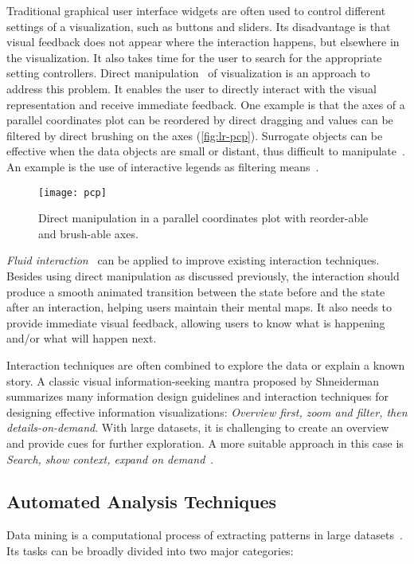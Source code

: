 Traditional graphical user interface widgets are often used to control different settings of a visualization, such as buttons and sliders. Its disadvantage is that visual feedback does not appear where the interaction happens, but elsewhere in the visualization. It also takes time for the user to search for the appropriate setting controllers. Direct manipulation~\cite{Shneiderman1982} of visualization is an approach to address this problem. It enables the user to directly interact with the visual representation and receive immediate feedback. One example is that the axes of a parallel coordinates plot can be reordered by direct dragging and values can be filtered by direct brushing on the axes (\autoref{fig:lr-pcp}). Surrogate objects can be effective when the data objects are small or distant, thus difficult to manipulate~\cite{Kwon2011}. An example is the use of interactive legends as filtering means~\cite{Riche2010b}.

\begin{figure}
	\centering
	\texttt{[image: pcp]}
	\caption[Direct manipulation in a parallel coordinates plot]{Direct manipulation in a parallel coordinates plot with reorder-able and brush-able axes.}
	\label{fig:lr-pcp}
\end{figure}

\emph{Fluid interaction}~\cite{Elmqvist2011} can be applied to improve existing interaction techniques. Besides using direct manipulation as discussed previously, the interaction should produce a smooth animated transition between the state before and the state after an interaction, helping users maintain their mental maps. It also needs to provide immediate visual feedback, allowing users to know what is happening and/or what will happen next.

Interaction techniques are often combined to explore the data or explain a known story. A classic visual information-seeking mantra proposed by Shneiderman~\cite{Shneiderman1996} summarizes many information design guidelines and interaction techniques for designing effective information visualizations: \emph{Overview first, zoom and filter, then details-on-demand}. With large datasets, it is challenging to create an overview and provide cues for further exploration. A more suitable approach in this case is \emph{Search, show context, expand on demand}~\cite{VanHam2009}.

\subsection{Automated Analysis Techniques}
\label{sub:lr-analysis}
Data mining is a computational process of extracting patterns in large datasets~\cite{Tan2006}. Its tasks can be broadly divided into two major categories:

